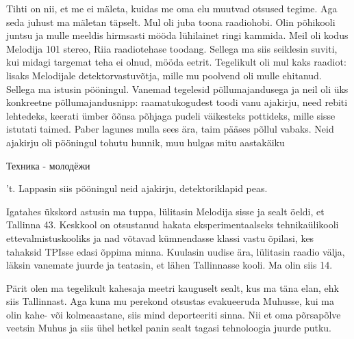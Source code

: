

Tihti on nii, et me ei mäleta, kuidas me oma elu muutvad otsused  
tegime. Aga seda juhust ma mäletan täpselt. Mul oli juba toona 
raadiohobi. Olin põhikooli juntsu ja mulle meeldis hirmsasti mööda 
lühilainet ringi kammida. Meil oli kodus Melodija 101 stereo, Riia 
raadiotehase toodang. Sellega ma siis seiklesin suviti, kui midagi targemat 
teha ei olnud, mööda eetrit. Tegelikult oli mul kaks raadiot: lisaks Melodijale 
detektorvastuvõtja, mille mu poolvend 
oli mulle ehitanud. Sellega ma istusin pööningul. Vanemad tegelesid 
põllumajandusega ja neil oli 
üks konkreetne põllumajandusnipp: raamatukogudest toodi vanu ajakirju, 
need rebiti lehtedeks, keerati ümber õõnsa 
põhjaga pudeli väikesteks pottideks, mille sisse istutati taimed. 
Paber lagunes mulla sees ära, taim pääses põllul vabaks. Neid ajakirju oli 
pööningul tohutu hunnik, muu hulgas mitu aastakäiku 
\begin{russian}Техника - молодёжи\end{russian}'t. Lappasin siis 
pööningul neid ajakirju, detektoriklapid peas. 

Igatahes ükskord astusin ma tuppa, lülitasin Melodija sisse ja sealt öeldi, et 
Tallinna 43. Keskkool 
on otsustanud hakata 
eksperimentaalseks tehnikaülikooli ettevalmistuskooliks ja 
nad võtavad kümnendasse klassi vastu õpilasi, kes tahaksid TPIsse edasi õppima 
minna. Kuulasin uudise ära, lülitasin raadio välja, läksin vanemate juurde ja 
teatasin, et lähen Tallinnasse kooli. Ma olin siis 14.



Pärit olen ma tegelikult kahesaja meetri kauguselt sealt, kus ma täna elan, 
ehk siis Tallinnast. Aga kuna mu perekond otsustas evakueeruda 
Muhusse, kui ma olin kahe- või kolmeaastane, siis mind 
deporteeriti sinna. Nii et oma põrsapõlve veetsin Muhus ja siis ühel 
hetkel panin sealt tagasi tehnoloogia juurde putku. 

